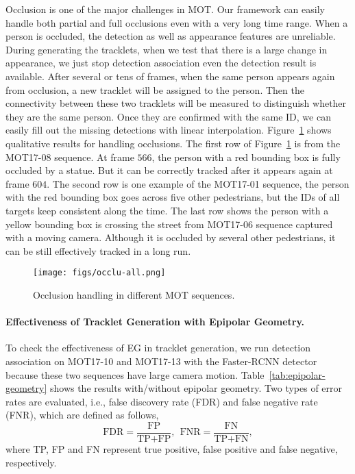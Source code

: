 \documentclass[10pt,twocolumn,letterpaper]{article}
\begin{document}
Occlusion is one of the major challenges in MOT. Our framework can easily handle both partial and full occlusions even with a very long time range. 
When a person is occluded, the detection as well as appearance features are unreliable. 
During generating the tracklets, when we test that there is a large change in appearance, we just stop detection association even the detection result is available. After several 
or tens of frames, when the same person appears again from occlusion, a new tracklet will be assigned to the person. Then the connectivity between these two tracklets will be measured to distinguish whether they are the same person. Once they are confirmed with the same ID, we can easily fill out the missing detections with linear interpolation. Figure~\ref{fig:occlusion} shows qualitative results for handling occlusions. The first row of Figure~\ref{fig:occlusion} is from the MOT17-08 sequence. At frame $566$, the person with a red bounding box is fully occluded by a statue. But it can be correctly tracked after it appears again at frame $604$. The second row is one example of the MOT17-01 sequence, the person with the red bounding box goes across five other pedestrians, but the IDs of all targets keep consistent along the time. The last row shows the person with a yellow bounding box is crossing the street from MOT17-06 sequence captured with a moving camera. Although it is occluded by several other pedestrians, it can be still effectively tracked in a long run.

\begin{figure}
\begin{center}
\texttt{[image: figs/occlu-all.png]}
\end{center}
    \caption{Occlusion handling in different MOT sequences. }
\label{fig:occlusion}
\end{figure}

\paragraph{Effectiveness of Tracklet Generation with Epipolar Geometry.}

To check the effectiveness of EG in tracklet generation, we run detection association on MOT17-10 and MOT17-13 with the Faster-RCNN detector because these two sequences have large camera motion. Table~\ref{tab:epipolar-geometry} shows the results with/without epipolar geometry. Two types of error rates are evaluated, i.e., false discovery rate (FDR) and false negative rate (FNR), which are defined as follows, 
\begin{equation}
    \text{FDR} = \frac{\text{FP}}{\text{TP} + \text{FP}},\ \ 
    \text{FNR} = \frac{\text{FN}}{\text{TP} + \text{FN}},
\end{equation}
where TP, FP and FN represent true positive, false positive and false negative, respectively. 
\end{document}
